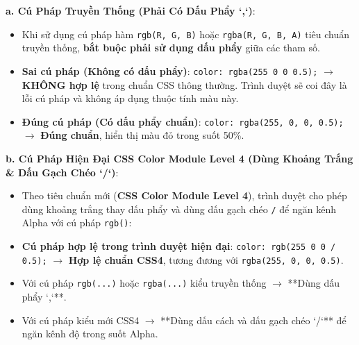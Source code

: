 \documentclass[11pt,oneside]{book}
\newcommand{\codeinline}[1]{\textcolor{accentOrange}{\texttt{#1}}}
\newcommand{\term}[1]{\textbf{\textcolor{primaryBlue}{#1}}}
\begin{document}
\begin{conceptBox}
\textbf{a. Cú Pháp Truyền Thống (Phải Có Dấu Phẩy `,`)}:
\begin{itemize}[leftmargin=1.5em, itemsep=3pt, parsep=0pt]
    \item Khi sử dụng cú pháp hàm \codeinline{rgb(R, G, B)} hoặc \codeinline{rgba(R, G, B, A)} tiêu chuẩn truyền thống, \textbf{bắt buộc phải sử dụng dấu phẩy} giữa các tham số.
    \item \textcolor{red!80!black}{\textbf{Sai cú pháp (Không có dấu phẩy)}}:
    \codeinline{color: rgba(255 0 0 0.5);} $\rightarrow$ \textcolor{red!80!black}{\textbf{KHÔNG hợp lệ}} trong chuẩn CSS thông thường. Trình duyệt sẽ coi đây là lỗi cú pháp và không áp dụng thuộc tính màu này.
    \item \textcolor{green!60!black}{\textbf{Đúng cú pháp (Có dấu phẩy chuẩn)}}:
    \codeinline{color: rgba(255, 0, 0, 0.5);} $\rightarrow$ \textcolor{green!60!black}{\textbf{Đúng chuẩn}}, hiển thị màu đỏ trong suốt 50\%.
\end{itemize}

\textbf{b. Cú Pháp Hiện Đại CSS Color Module Level 4 (Dùng Khoảng Trắng \& Dấu Gạch Chéo `/`)}:
\begin{itemize}[leftmargin=1.5em, itemsep=3pt, parsep=0pt]
    \item Theo tiêu chuẩn mới (\term{CSS Color Module Level 4}), trình duyệt cho phép dùng khoảng trắng thay dấu phẩy và dùng dấu gạch chéo \codeinline{/} để ngăn kênh Alpha với cú pháp \codeinline{rgb()}:
    \item \textcolor{green!60!black}{\textbf{Cú pháp hợp lệ trong trình duyệt hiện đại}}:
    \codeinline{color: rgb(255 0 0 / 0.5);} $\rightarrow$ \textcolor{green!60!black}{\textbf{Hợp lệ chuẩn CSS4}}, tương đương với \codeinline{rgba(255, 0, 0, 0.5)}.
\end{itemize}
\end{conceptBox}

\begin{tipBox}
\begin{itemize}[leftmargin=1.5em, itemsep=3pt, parsep=0pt]
    \item Với cú pháp \codeinline{rgb(...)} hoặc \codeinline{rgba(...)} kiểu truyền thống $\rightarrow$ **Dùng dấu phẩy `,`**.
    \item Với cú pháp kiểu mới CSS4 $\rightarrow$ **Dùng dấu cách và dấu gạch chéo `/`** để ngăn kênh độ trong suốt Alpha.
\end{itemize}
\end{tipBox}
\end{document}
